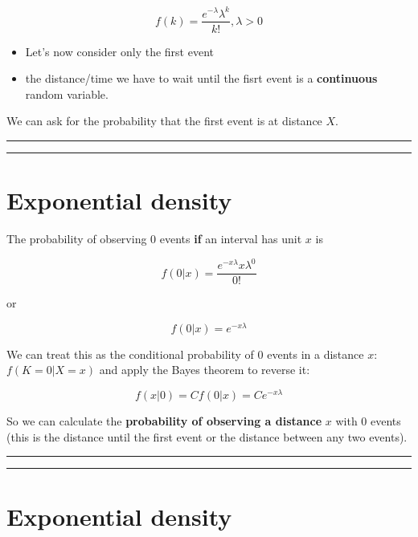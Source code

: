 \documentclass[
]{book}
\begin{document}
\[f(k)=\frac{e^{-\lambda}\lambda^k}{k!}, \lambda>0\]

\begin{itemize}
\item
  Let's now consider only the first event
\item
  the distance/time we have to wait until the fisrt event is a \textbf{continuous} random variable.
\end{itemize}

We can ask for the probability that the first event is at distance \(X\).

\begin{center}\rule{0.5\linewidth}{0.5pt}\end{center}

\begin{center}\rule{0.5\linewidth}{0.5pt}\end{center}

\hypertarget{exponential-density-1}{%
\section{Exponential density}\label{exponential-density-1}}

The probability of observing \(0\) events \textbf{if} an interval has unit \(x\) is

\[f(0|x)=\frac{e^{-x\lambda}x\lambda^0}{0!}\]

or

\[f(0|x)=e^{-x\lambda}\]

We can treat this as the conditional probability of \(0\) events in a distance \(x\): \(f(K=0|X=x)\) and apply the Bayes theorem to reverse it:

\[f(x|0)=C f(0|x)=C e^{-x\lambda}\]

So we can calculate the \textbf{probability of observing a distance} \(x\) with \(0\) events (this is the distance until the first event or the distance between any two events).

\begin{center}\rule{0.5\linewidth}{0.5pt}\end{center}

\begin{center}\rule{0.5\linewidth}{0.5pt}\end{center}

\hypertarget{exponential-density-2}{%
\section{Exponential density}\label{exponential-density-2}}
\end{document}
